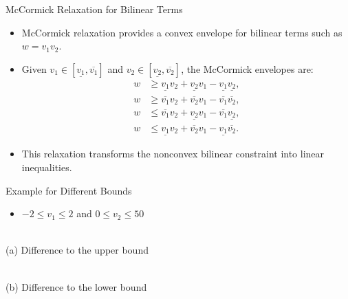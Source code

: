 \documentclass[shortpres,aspectratio=43]{beamer}
\begin{document}
\begin{frame}{McCormick Relaxation for Bilinear Terms}
  \begin{itemize}
    \item McCormick relaxation provides a convex envelope for bilinear terms such as $w = v_1v_2$.
    \item Given $v_1\in[\underline{v_1}, \overline{v_1}]$ and $v_2\in[\underline{v_2}, \overline{v_2}]$, the McCormick envelopes are:
          \begin{align*}
            w & \geq \underline{v_1} v_2 + \underline{v_2} v_1 - \underline{v_1} \underline{v_2}, \\
            w & \geq \overline{v_1} v_2 + \overline{v_2} v_1 - \overline{v_1} \overline{v_2},     \\
            w & \leq \overline{v_1} v_2 + \underline{v_2} v_1 - \overline{v_1} \underline{v_2},   \\
            w & \leq \underline{v_1} v_2 + \overline{v_2} v_1 - \underline{v_1} \overline{v_2}.
          \end{align*}
    \item This relaxation transforms the nonconvex bilinear constraint into linear inequalities.
  \end{itemize}
\end{frame}

\begin{frame}{Example for Different Bounds}
  \begin{itemize}
    \item $ -2 \leq v_1 \leq 2 $ and $ 0 \leq v_2 \leq 50 $
  \end{itemize}

  \centering
  \begin{minipage}[b]{0.45\textwidth}
    \centering
    \resizebox{\textwidth}{!}{}\\
    \small (a) Difference to the upper bound
  \end{minipage}
  \hfill
  \begin{minipage}[b]{0.45\textwidth}
    \centering
    \resizebox{\textwidth}{!}{}\\
    \small (b) Difference to the lower bound
  \end{minipage}

\end{frame}
\end{document}
